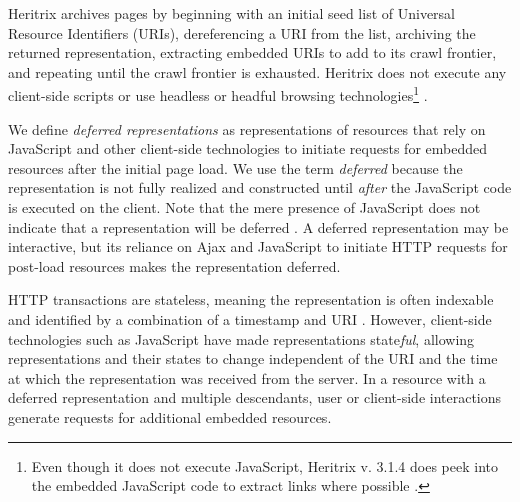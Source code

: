 \documentclass{sig-alternate}
\begin{document}
Heritrix archives pages by beginning with an initial seed list of Universal Resource Identifiers (URIs), dereferencing a URI from the list, archiving the returned representation, extracting embedded URIs to add to its crawl frontier, and repeating until the crawl frontier is exhausted. Heritrix does not execute any client-side scripts or use headless or headful browsing technologies\footnote{Even though it does not execute JavaScript, Heritrix v. 3.1.4 does peek into the embedded JavaScript code to extract links where possible \cite{htrixJS}.} \cite{googleJS}. 

We define \emph{deferred representations} as representations of resources that rely on JavaScript and other client-side technologies to initiate requests for embedded resources after the initial page load. We use the term \emph{deferred} because the representation is not fully realized and constructed until \emph{after} the JavaScript code is executed on the client. 
Note that the mere presence of JavaScript does not indicate that a representation will be deferred%
. A deferred representation may be interactive, but its reliance on Ajax and JavaScript to initiate HTTP requests for post-load resources makes the representation deferred.

HTTP transactions are stateless, meaning the representation is often indexable and identified by a combination of a timestamp and URI \cite{Fielding:2002:PDM:514183.514185}. However, 
client-side technologies such as JavaScript have made representations state\emph{ful}, allowing representations and their states to change independent of the URI and the time at which the representation was received from the server. In a resource with a deferred representation and multiple descendants, user or client-side interactions generate requests for additional embedded resources.


\end{document}
